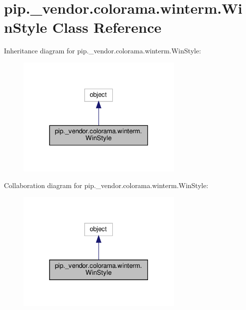\hypertarget{classpip_1_1__vendor_1_1colorama_1_1winterm_1_1WinStyle}{}\section{pip.\+\_\+vendor.\+colorama.\+winterm.\+Win\+Style Class Reference}
\label{classpip_1_1__vendor_1_1colorama_1_1winterm_1_1WinStyle}


Inheritance diagram for pip.\+\_\+vendor.\+colorama.\+winterm.\+Win\+Style\+:
\nopagebreak
\begin{figure}[H]
\begin{center}
\leavevmode
\includegraphics[width=230pt]{classpip_1_1__vendor_1_1colorama_1_1winterm_1_1WinStyle__inherit__graph}
\end{center}
\end{figure}


Collaboration diagram for pip.\+\_\+vendor.\+colorama.\+winterm.\+Win\+Style\+:
\nopagebreak
\begin{figure}[H]
\begin{center}
\leavevmode
\includegraphics[width=230pt]{classpip_1_1__vendor_1_1colorama_1_1winterm_1_1WinStyle__coll__graph}
\end{center}
\end{figure}
